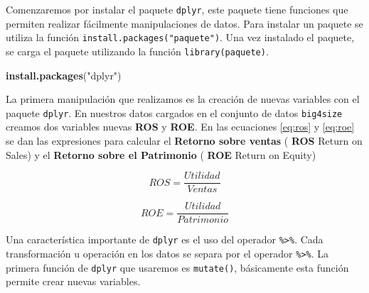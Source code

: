 \documentclass[
]{krantz}
\makeatletter
\newenvironment{Shaded}{\begin{snugshade}}{\end{snugshade}}
\newcommand{\DataTypeTok}[1]{\textcolor[rgb]{0.27,0.27,0.27}{#1}}
\newcommand{\KeywordTok}[1]{\textcolor[rgb]{0.27,0.27,0.27}{\textbf{#1}}}
\newcommand{\NormalTok}[1]{#1}
\newcommand{\OperatorTok}[1]{\textcolor[rgb]{0.43,0.43,0.43}{\textbf{#1}}}
\newcommand{\StringTok}[1]{\textcolor[rgb]{0.5,0.5,0.5}{#1}}
\newenvironment{kframe}{%
\medskip{}
\setlength{\fboxsep}{.8em}
 \def\at@end@of@kframe{}%
 \ifinner\ifhmode%
  \def\at@end@of@kframe{\end{minipage}}%
  \begin{minipage}{\columnwidth}%
 \fi\fi%
 \def\FrameCommand##1{\hskip\@totalleftmargin \hskip-\fboxsep
 \colorbox{shadecolor}{##1}\hskip-\fboxsep
     \hskip-\linewidth \hskip-\@totalleftmargin \hskip\columnwidth}%
 \MakeFramed {\advance\hsize-\width
   \@totalleftmargin\z@ \linewidth\hsize
   \@setminipage}}%
 {\par\unskip\endMakeFramed%
 \at@end@of@kframe}
\renewenvironment{Shaded}{\begin{kframe}}{\end{kframe}}
\makeatother
\begin{document}
Comenzaremos por instalar el paquete \texttt{dplyr}, este paquete tiene funciones que permiten realizar fácilmente manipulaciones de datos. Para instalar un paquete se utiliza la función \texttt{install.packages("paquete")}. Una vez instalado el paquete, se carga el paquete utilizando la función \texttt{library(paquete)}.

\begin{Shaded}
\begin{Highlighting}[]
\KeywordTok{install.packages}\NormalTok{(}\StringTok{"dplyr"}\NormalTok{)}
\end{Highlighting}
\end{Shaded}

La primera manipulación que realizamos es la creación de nuevas variables con el paquete \texttt{dplyr}. En nuestros datos cargados en el conjunto de datos \texttt{big4size} creamos dos variables nuevas \textbf{ROS} y \textbf{ROE}. En las ecuaciones \eqref{eq:ros} y \eqref{eq:roe} se dan las expresiones para calcular el \textbf{Retorno sobre ventas} ( \textbf{ROS} Return on Sales) y el \textbf{Retorno sobre el Patrimonio} ( \textbf{ROE} Return on Equity)

\begin{equation} 
  ROS = \dfrac{Utilidad}{Ventas}
  \label{eq:ros}
\end{equation}

\begin{equation} 
  ROE = \dfrac{Utilidad}{Patrimonio}
  \label{eq:roe}
\end{equation}

Una característica importante de \texttt{dplyr} es el uso del operador \texttt{\%\textgreater{}\%}. Cada transformación u operación en los datos se separa por el operador \texttt{\%\textgreater{}\%}. La primera función de \texttt{dplyr} que usaremos es \texttt{mutate()}, básicamente esta función permite crear nuevas variables.

\begin{Shaded}
\end{Shaded}
\end{document}
